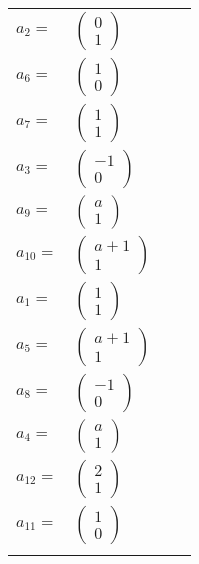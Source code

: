 \documentclass[1p]{elsarticle_modified}
\theoremstyle{definition}
\begin{document}
\begin{tabular}{m{7pt} m{180pt} m{7pt} m{180pt} }
\flushright $a_{2}=$&$\begin{pmatrix}0\\1\end{pmatrix}$ \\
\flushright $a_{6}=$&$\begin{pmatrix}1\\0\end{pmatrix}$ \\
\flushright $a_{7}=$&$\begin{pmatrix}1\\1\end{pmatrix}$ \\
\flushright $a_{3}=$&$\begin{pmatrix}-1\\0\end{pmatrix}$ \\
\flushright $a_{9}=$&$\begin{pmatrix}a\\1\end{pmatrix}$ \\
\flushright $a_{10}=$&$\begin{pmatrix}a+1\\1\end{pmatrix}$ \\
\flushright $a_{1}=$&$\begin{pmatrix}1\\1\end{pmatrix}$ \\
\flushright $a_{5}=$&$\begin{pmatrix}a+1\\1\end{pmatrix}$ \\
\flushright $a_{8}=$&$\begin{pmatrix}-1\\0\end{pmatrix}$ \\
\flushright $a_{4}=$&$\begin{pmatrix}a\\1\end{pmatrix}$ \\
\flushright $a_{12}=$&$\begin{pmatrix}2\\1\end{pmatrix}$ \\
\flushright $a_{11}=$&$\begin{pmatrix}1\\0\end{pmatrix}$\\&\end{tabular}
\end{document}
